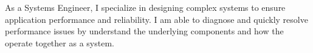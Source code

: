 

\begin{cvparagraph}

As a Systems Engineer,  I specialize in designing complex systems to ensure application performance and reliability.  I am able to diagnose and quickly resolve performance issues by understand the underlying components and how the operate together as a system.
\end{cvparagraph}
